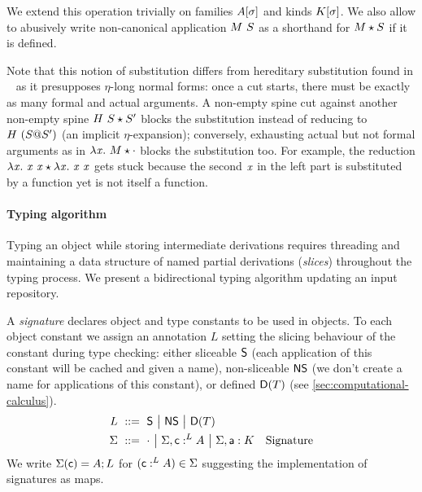 \documentclass[9pt]{sigplanconf}
\begin{document}
We extend this operation trivially on families ${A}[{\sigma}]$ and
kinds ${K}[{\sigma}]$. We also allow to abusively write
non-canonical application ${M}\  S$ as a shorthand for ${M}\star{S}$
if it is defined.

Note that this notion of substitution differs from hereditary
substitution found in \eg\ \cite{hl07mechanizing} as it presupposes
$\eta$-long normal forms: once a cut starts, there must be exactly as
many formal and actual arguments. A non-empty spine cut against
another non-empty spine ${{H}\  S}\star{S'}$ blocks the
substitution instead of reducing to ${H}\  {({S}@{S}')}$ (an
implicit $\eta$-expansion); conversely, exhausting actual but not
formal arguments as in ${\lambda{\ensuremath{\text{\textit{x}}}}.\  M}\star{\cdot}$ blocks the
substitution too. For example, the reduction ${\lambda{\ensuremath{\text{\textit{x}}}}.\  {\text{\textit{x}}}\ {\text{\textit{x}}}}\star{\lambda{\ensuremath{\text{\textit{x}}}}.\ {\ensuremath{\text{\textit{x}}}}\ {\ensuremath{\text{\textit{x}}}}}$ gets stuck because the
second $\text{\textit{x}}$ in the left part is substituted by a function yet is
not itself a function.


\paragraph{Typing algorithm}

Typing an object while storing intermediate derivations requires
threading and maintaining a data structure of named partial
derivations (\emph{slices}) throughout the typing process. We present
a bidirectional typing algorithm updating an input repository.

A \emph{signature} declares object and type constants to be used in
objects. To each object constant we assign an annotation $L$ setting
the slicing behaviour of the constant during type checking: either
sliceable $\mathsf{S}$ (each application of this constant will be
cached and given a name), non-sliceable $\mathsf{NS}$ (we don't
create a name for applications of this constant), or defined
$\mathsf{D}({T})$ (see \ref{sec:computational-calculus}).
\begin{align*}
  L &\ ::=\ 
  \mathsf{S} \ {\big|}\ 
  \mathsf{NS} \ {\big|}\ 
  \mathsf{D}({T})
  \\
  \Sigma &\ ::=\ 
  \cdot \ {\big|}\ 
  {\Sigma},{\text{\textsf{c}} :^L A} \ {\big|}\ 
  {\Sigma},{\text{\textsf{a}} : K}
  &\text{Signature}
\end{align*}
We write $\Sigma(\text{\textsf{c}}) = A; L$ for $(\text{\textsf{c}} :^L A) \in \Sigma$
suggesting the implementation of signatures as maps.
\end{document}
